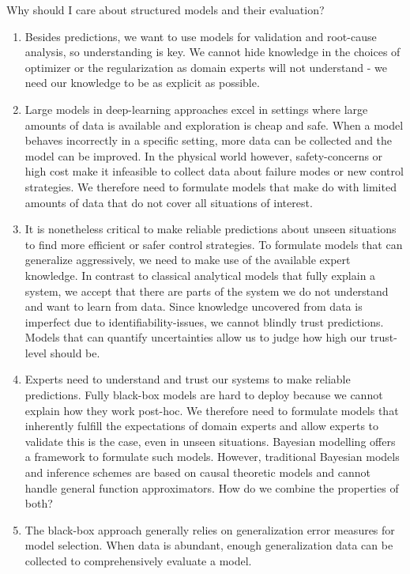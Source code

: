 Why should I care about structured models and their evaluation?
\begin{enumerate}
    \item Besides predictions, we want to use models for validation and root-cause analysis, so understanding is key. We cannot hide knowledge in the choices of optimizer or the regularization as domain experts will not understand - we need our knowledge to be as explicit as possible.

    \item Large models in deep-learning approaches excel in settings where large amounts of data is available and exploration is cheap and safe.
    When a model behaves incorrectly in a specific setting, more data can be collected and the model can be improved.
    In the physical world however, safety-concerns or high cost make it infeasible to collect data about failure modes or new control strategies.
    We therefore need to formulate models that make do with limited amounts of data that do not cover all situations of interest.
    \item It is nonetheless critical to make reliable predictions about unseen situations to find more efficient or safer control strategies.
    To formulate models that can generalize aggressively, we need to make use of the available expert knowledge.
    In contrast to classical analytical models that fully explain a system, we accept that there are parts of the system we do not understand and want to learn from data.
    Since knowledge uncovered from data is imperfect due to identifiability-issues, we cannot blindly trust predictions.
    Models that can quantify uncertainties allow us to judge how high our trust-level should be.
    \item Experts need to understand and trust our systems to make reliable predictions.
    Fully black-box models are hard to deploy because we cannot explain how they work post-hoc.
    We therefore need to formulate models that inherently fulfill the expectations of domain experts and allow experts to validate this is the case, even in unseen situations.
    Bayesian modelling offers a framework to formulate such models.
    However, traditional Bayesian models and inference schemes are based on causal theoretic models and cannot handle general function approximators.
    How do we combine the properties of both?
    \item The black-box approach generally relies on generalization error measures for model selection.
    When data is abundant, enough generalization data can be collected to comprehensively evaluate a model.

\end{enumerate}
